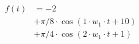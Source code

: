 \begin{center}
\begin{align*}
f(t) &= -2 \\
&+ \pi/8 \cdot \cos( 1 \cdot w_1 \cdot t +10 ) \\
&+  \pi/4 \cdot \cos( 2 \cdot w_1 \cdot t +1)
\end{align*}
\end{center}
